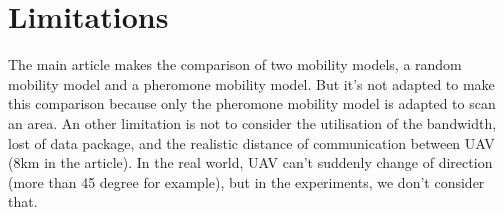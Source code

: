 \chapter{Limitations}

The main article \cite{UAV} makes the comparison of two mobility models, a random mobility model and a pheromone mobility model. But it's not adapted to make this comparison because only the pheromone mobility model is adapted to scan an area.
An other limitation is not to consider the utilisation of the bandwidth, lost of data package, and the realistic distance of communication between UAV (8km in the article).
In the real world, UAV can't suddenly change of direction (more than 45 degree for example), but in the experiments, we don't consider that.